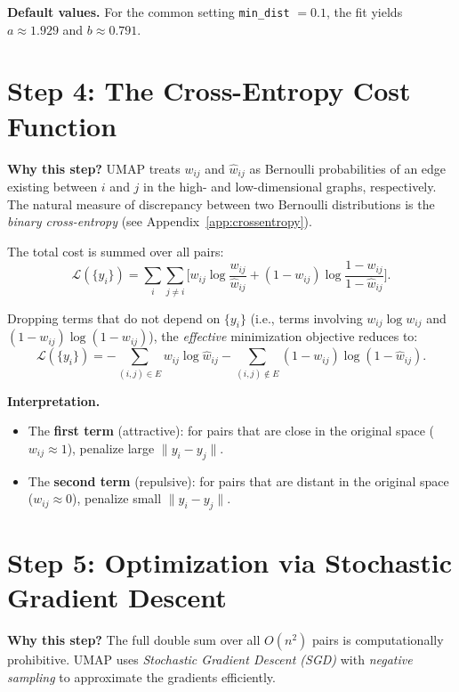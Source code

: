 \documentclass[11pt]{article}
\begin{document}
\textbf{Default values.} For the common setting \texttt{min\_dist} $= 0.1$, the fit yields $a \approx 1.929$ and $b \approx 0.791$.

\section*{Step 4: The Cross-Entropy Cost Function}

\textbf{Why this step?} UMAP treats $w_{ij}$ and $\hat{w}_{ij}$ as Bernoulli probabilities of an edge existing between $i$ and $j$ in the high- and low-dimensional graphs, respectively. The natural measure of discrepancy between two Bernoulli distributions is the \emph{binary cross-entropy} (see Appendix~\ref{app:crossentropy}).

The total cost is summed over all pairs:
\[
  \mathcal{L}(\{y_i\}) = \sum_{i} \sum_{j \neq i} \Big[
    w_{ij} \log \frac{w_{ij}}{\hat{w}_{ij}}
    + (1 - w_{ij}) \log \frac{1 - w_{ij}}{1 - \hat{w}_{ij}}
  \Big].
\]

Dropping terms that do not depend on $\{y_i\}$ (i.e., terms involving $w_{ij} \log w_{ij}$ and $(1-w_{ij})\log(1-w_{ij})$), the \emph{effective} minimization objective reduces to:
\[
  \boxed{
    \mathcal{L}(\{y_i\}) = -\sum_{(i,j) \in E} w_{ij} \log \hat{w}_{ij}
    - \sum_{(i,j) \notin E} (1 - w_{ij}) \log (1 - \hat{w}_{ij}).
  }
\]

\textbf{Interpretation.}
\begin{itemize}
  \item The \textbf{first term} (attractive): for pairs that are close in the original space ($w_{ij} \approx 1$), penalize large $\|y_i - y_j\|$.
  \item The \textbf{second term} (repulsive): for pairs that are distant in the original space ($w_{ij} \approx 0$), penalize small $\|y_i - y_j\|$.
\end{itemize}

\section*{Step 5: Optimization via Stochastic Gradient Descent}

\textbf{Why this step?} The full double sum over all $O(n^2)$ pairs is computationally prohibitive. UMAP uses \emph{Stochastic Gradient Descent (SGD)} with \emph{negative sampling} to approximate the gradients efficiently.
\end{document}
